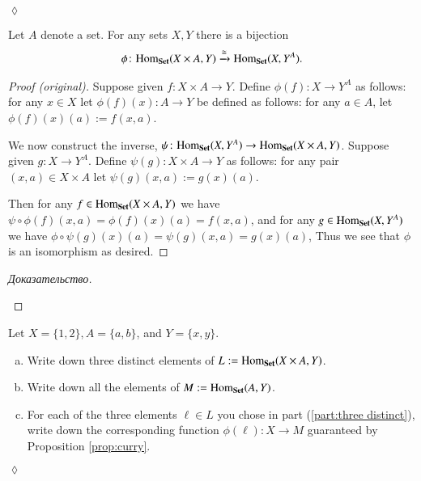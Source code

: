 \documentclass[a4paper]{book}
\def\tn{\textnormal}
\def\Hom{\tn{Hom}}
\def\to{\rightarrow}
\def\taking{\colon}
\def\iso{\cong}
\newcommand{\To}[1]{\xrightarrow{#1}}
\def\Set{{\bf Set}}
\theoremstyle{myth}
\newtheorem{propositionENG}[envENG]{\begin{english}Proposition\end{english}}
\newtheorem{excENG}[envENG]{\begin{english}Exercise\end{english}}
\newenvironment{proofENG}{\begin{proof}[Proof (original)]}{\end{proof}}
\newenvironment{exerciseENG}{\begin{excENG}}{\hspace*{\fill}$\lozenge$\end{excENG}}
\newtheorem{propositionRUS}[envRUS]{\begin{russian}Утверждение\end{russian}}
\newtheorem{excRUS}[envRUS]{\begin{russian}Упражнение\end{russian}}
\newenvironment{proofRUS}{\begin{proof}[Доказательство]}{\end{proof}}
\newenvironment{exerciseRUS}{\begin{excRUS}}{\hspace*{\fill}$\lozenge$\end{excRUS}}
\def\sexc{\begin{enumerate}[a.)]\setlength{\itemsep}{.1cm}\setlength{\parskip}{.1cm}\item}
\def\next{\item}
\def\endsexc{\end{enumerate}}
\begin{document}
\begin{english}
\begin{exerciseRUS}
\begin{russian} \end{russian}
\end{exerciseRUS}

\begin{propositionENG}[Currying]\label{prop:curry}
Let $A$ denote a set. For any sets $X,Y$ there is a bijection 
\begin{align}\label{dia:curry bijection}
\phi\taking\Hom_\Set(X\times A,Y)\To{\iso}\Hom_\Set(X,Y^A).
\end{align}
\end{propositionENG}

\begin{propositionRUS}[Каррирование]\label{prop:curry}
\begin{russian} \end{russian}
\end{propositionRUS}

\begin{proofENG}
Suppose given $f\taking X\times A\to Y$. Define $\phi(f)\taking X\to Y^A$ as follows: for any $x\in X$ let $\phi(f)(x)\taking A\to Y$ be defined as follows: for any $a\in A$, let $\phi(f)(x)(a):=f(x,a)$. 

We now construct the inverse, $\psi\taking\Hom_\Set(X,Y^A)\to\Hom_\Set(X\times A,Y)$. Suppose given $g\taking X\to Y^A$. Define $\psi(g)\taking X\times A\to Y$ as follows: for any pair $(x,a)\in X\times A$ let $\psi(g)(x,a):=g(x)(a)$. 

Then for any $f\in\Hom_\Set(X\times A,Y)$ we have $\psi\circ\phi(f)(x,a)=\phi(f)(x)(a)=f(x,a)$, and for any $g\in\Hom_\Set(X,Y^A)$ we have $\phi\circ\psi(g)(x)(a)=\psi(g)(x,a)=g(x)(a)$, Thus we see that $\phi$ is an isomorphism as desired.
\end{proofENG}

\begin{proofRUS}
\begin{russian} \end{russian}
\end{proofRUS}

\begin{exerciseENG}
Let $X=\{1,2\}, A=\{a,b\}$, and $Y=\{x,y\}$. 
\sexc\label{part:three distinct} Write down three distinct elements of $L:=\Hom_\Set(X\times A,Y)$. 
\next Write down all the elements of $M:=\Hom_\Set(A,Y)$. 
\next For each of the three elements $\ell\in L$ you chose in part (\ref{part:three distinct}), write down the corresponding function $\phi(\ell)\taking X\to M$ guaranteed by Proposition \ref{prop:curry}.
\endsexc
\end{exerciseENG}


\end{english}
\end{document}
